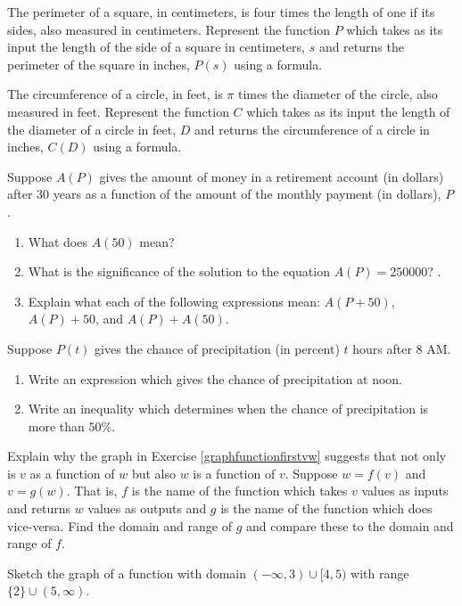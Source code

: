 \begin{exenum}
\item  The perimeter of a square, in centimeters,  is four times the length of one if its sides, also measured in centimeters.  Represent the function $P$ which takes as its input the length of the side of a square in centimeters, $s$ and returns the perimeter of the square in inches, $P(s)$ using a formula.

\item  The circumference of a circle, in feet,  is $\pi$ times the diameter of the circle, also measured in feet.  Represent the function $C$ which takes as its input the length of the diameter of a circle in feet, $D$ and returns the circumference of a circle in inches, $C(D)$ using a formula.

\item  Suppose $A(P)$ gives the amount of money in a retirement account (in dollars) after 30 years as a function of the amount of the monthly payment (in dollars), $P$.

\begin{enumerate}
\item What does $A(50)$ mean?  
\item  What is the significance of the solution to the equation $A(P) = 250000$? .
\item  Explain what each of the following expressions mean:  $A(P+50)$, $A(P)+50$, and $A(P) + A(50)$.  
\end{enumerate}

\item  Suppose $P(t)$ gives the chance of precipitation (in percent)  $t$ hours after 8 AM.

\begin{enumerate}
\item  Write an expression which gives the chance of precipitation at noon.
\item  Write an inequality which determines when the chance of precipitation is more than $50 \%$.
\end{enumerate}

\item Explain why the graph in  Exercise \ref{graphfunctionfirstvw}  suggests that not only is $v$ as a function of $w$ but also $w$ is a function of $v$.  Suppose $w = f(v)$ and $v = g(w)$.  That is, $f$ is the name of the function which takes $v$ values as inputs and returns $w$ values as outputs and $g$ is the name of the function which does vice-versa.   Find the domain and range of  $g$ and compare these to the domain and range of $f$.  

\item Sketch the graph of a function with domain $(-\infty, 3) \cup [4,5)$ with range $\{ 2 \} \cup (5, \infty)$.

\end{exenum}

